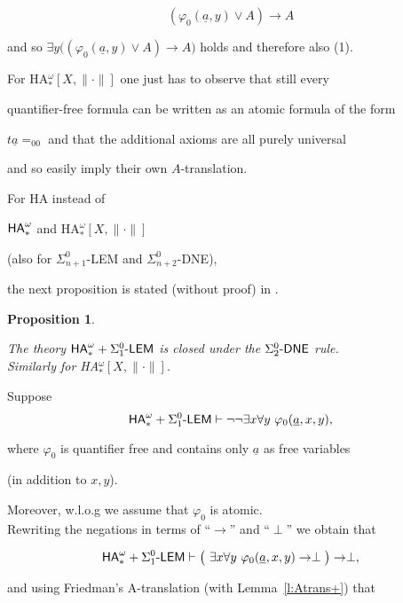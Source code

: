 \documentclass[1p]{elsarticle}
\newcommand{\usftext}[1]{\textsf{\upshape #1}}
\newcommand{\ha}{\ensuremath{{\usftext{HA}}^\omega}} %
\newcommand{\LEM}{\ensuremath{\Sigma^0_1\usftext{-LEM}}}
\newcommand{\DNE}{\ensuremath{\usftext{DNE}}}
\newcommand{\m}{\ensuremath{\usftext{-}}}
\newcommand{\tup}{\underline} %
\theoremstyle{plain}
\newtheorem{prop}[thm]{Proposition}
\theoremstyle{definition}
\theoremstyle{remark}
\renewenvironment{proof}[1][]{\noindent{\bf Proof{#1}. }}{\nopagebreak[4]{\hspace*{\fill}


  $\Box$              %

 }{\vspace{2ex}}}
\renewcommand{\phi}{\varphi}
\theoremstyle{definition}
\begin{document}
{\begin{proof}
\begin{enumerate}
\[(\phi_0(\tup a,y) \vee A) \rightarrow A\]

and so $ \exists y \big(  (\phi_0(\tup a,y) \vee A) \rightarrow A\big)$ holds and therefore also (1). 

\end{enumerate}

For HA$_*^{\omega}[X,\|\cdot\|]$ one just has to observe that still every 

quantifier-free formula can be written as an atomic formula of the form 

$t\underline{a}=_00$ and that the additional axioms are all purely universal 

and so easily imply their own $A$-translation.  

\end{proof} 



For HA instead of 

$\ha_*$ and HA$_*^{\omega}[X,\|\cdot\|]$ 

(also for $\Sigma^0_{n+1}$-LEM and $\Sigma^0_{n+2}$-DNE), 

the next proposition is stated (without proof) in \cite{Hayashi/Nakata}. 

\begin{prop}\label{p:Atrans}

The theory $\ha_* + \LEM$ is closed under the $\Sigma^0_2\m\DNE$ rule. \\ 

Similarly for {\rm HA$_*^{\omega}[X,\|\cdot\|].$}

\end{prop}

\begin{proof} 

Suppose \[\ha_* + \LEM \vdash \neg\neg \exists x\forall y\ \phi_0(\tup a,x,y),\]

where $\phi_0$ is quantifier free and contains only $\tup a$ as free variables 

(in addition to $x,y$). 

Moreover, w.l.o.g we assume that $\phi_0$ is atomic.  \\

Rewriting the negations in terms of ``$\rightarrow$'' and ``$\perp$'' we obtain that

\[\ha_* + \LEM \vdash \big(\ \exists x\forall y\ \phi_0(\tup a,x,y)\rightarrow\perp\big)\rightarrow \perp,\]

and using Friedman's A-translation (with Lemma~\ref{l:Atrans+}) that


\end{proof}}
\end{document}
